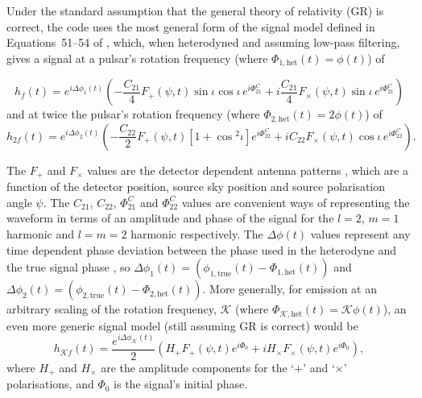 Under the standard assumption that the general theory of relativity (GR) is correct, the code uses the most general form of
the signal model defined in Equations~51--54 of \citet{2015arXiv150105832J}, which, when heterodyned and assuming low-pass
filtering, gives a signal at a pulsar's rotation frequency (where $\Phi_{1,{\text{het}}}(t) = \phi(t)$) of
\begin{widetext}
\begin{equation}\label{eq:hf}
h_f(t) =  e^{i\Delta\phi_1(t)}\left(-\frac{C_{21}}{4}F_{+}(\psi,t)\sin{\iota}\cos{\iota}\,e^{i\Phi_{21}^C} +
i\frac{C_{21}}{4}F_{\times}(\psi,t)\sin{\iota}\,e^{i\Phi_{21}^C} \right)
\end{equation}
and at twice the pulsar's rotation frequency (where $\Phi_{2,{\text{het}}}(t) = 2\phi(t)$) of
\begin{equation}\label{eq:h2f}
h_{2f}(t) =  e^{i\Delta\phi_2(t)}\left(-\frac{C_{22}}{2}F_{+}(\psi,t)[1+\cos{}^2\iota]e^{i\Phi_{22}^C} +
iC_{22}F_{\times}(\psi,t)\cos{\iota}\,e^{i\Phi_{22}^C} \right).
\end{equation}
\end{widetext}
The $F_{+}$ and $F_{\times}$ values are the detector dependent antenna patterns \citep[see, e.g., equation~\ref{eq:antenna}, taken from][]{1998PhRvD..58f3001J},
which are a function of the
detector position, source sky position and source polarisation angle $\psi$. The $C_{21}$, $C_{22}$,
$\Phi_{21}^C$ and $\Phi_{22}^C$ values are convenient ways of representing the waveform in terms of an
amplitude and phase of the signal for the $l=2$, $m=1$ harmonic and $l=m=2$ harmonic respectively. The
$\Delta\phi(t)$ values represent any time dependent phase deviation between the phase used in the heterodyne
and the true signal phase \citep[which does not necessarily have to precisely follow the electromagnetically observed rotational phase, see discussions in, e.g.,][]{2008ApJ...683L..45A}, so
$\Delta\phi_1(t) = (\phi_{1,{\text{true}}}(t)-\Phi_{1,{\text{het}}}(t))$ and $\Delta\phi_2(t) = (\phi_{2,{\text{true}}}(t)-\Phi_{2,{\text{het}}}(t))$. More generally,
for emission at an arbitrary scaling of the rotation frequency, $\mathcal{K}$ (where $\Phi_{\mathcal{K},{\text{het}}}(t) = \mathcal{K}\phi(t)$), an even more generic signal model (still assuming GR is correct) would be
\begin{equation}\label{eq:hkf}
h_{\mathcal{K}f}(t) =  \frac{e^{i\Delta\phi_{\mathcal{K}}(t)}}{2}\left(H_+F_{+}(\psi,t)e^{i\Phi_0} +
iH_{\times}F_{\times}(\psi,t)e^{i\Phi_{0}} \right),
\end{equation}
where $H_+$ and $H_{\times}$ are the amplitude components for the `$+$' and `$\times$' polarisations, and $\Phi_0$ is the signal's initial phase.

